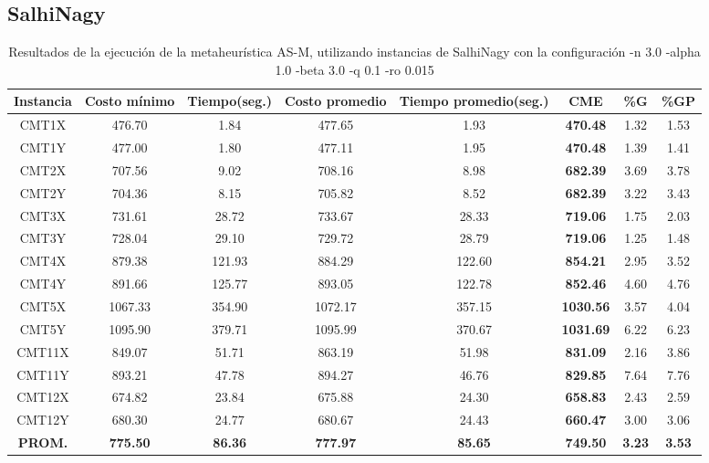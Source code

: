 \subsection{SalhiNagy}\label{tablas-entonacion-AS-M-salhinagy}
\begin{table}[h]
\caption{Resultados de la ejecución de la metaheurística AS-M, utilizando instancias de SalhiNagy con la configuración -n 3.0 -alpha 1.0 -beta 3.0 -q 0.1 -ro 0.015}
\centering
\small
\begin{tabular}{c c c c c c c c}
\hline\hline
Instancia & Costo mínimo & Tiempo(seg.) & Costo promedio & Tiempo promedio(seg.) & CME & \%G & \%GP \\ [0.5ex]
\hline
CMT1X & 476.70 & 1.84 & 
477.65 & 1.93 & \bf{470.48} & 
1.32 & 1.53\\CMT1Y & 477.00 & 1.80 & 
477.11 & 1.95 & \bf{470.48} & 
1.39 & 1.41\\CMT2X & 707.56 & 9.02 & 
708.16 & 8.98 & \bf{682.39} & 
3.69 & 3.78\\CMT2Y & 704.36 & 8.15 & 
705.82 & 8.52 & \bf{682.39} & 
3.22 & 3.43\\CMT3X & 731.61 & 28.72 & 
733.67 & 28.33 & \bf{719.06} & 
1.75 & 2.03\\CMT3Y & 728.04 & 29.10 & 
729.72 & 28.79 & \bf{719.06} & 
1.25 & 1.48\\CMT4X & 879.38 & 121.93 & 
884.29 & 122.60 & \bf{854.21} & 
2.95 & 3.52\\CMT4Y & 891.66 & 125.77 & 
893.05 & 122.78 & \bf{852.46} & 
4.60 & 4.76\\CMT5X & 1067.33 & 354.90 & 
1072.17 & 357.15 & \bf{1030.56} & 
3.57 & 4.04\\CMT5Y & 1095.90 & 379.71 & 
1095.99 & 370.67 & \bf{1031.69} & 
6.22 & 6.23\\CMT11X & 849.07 & 51.71 & 
863.19 & 51.98 & \bf{831.09} & 
2.16 & 3.86\\CMT11Y & 893.21 & 47.78 & 
894.27 & 46.76 & \bf{829.85} & 
7.64 & 7.76\\CMT12X & 674.82 & 23.84 & 
675.88 & 24.30 & \bf{658.83} & 
2.43 & 2.59\\CMT12Y & 680.30 & 24.77 & 
680.67 & 24.43 & \bf{660.47} & 
3.00 & 3.06\\\bf{PROM.} & 
\bf{775.50} & \bf{86.36} & \bf{777.97} & \bf{85.65} & \bf{749.50} & \bf{3.23} & \bf{3.53}\\[1ex]\hline
\end{tabular}
\label{table:nonlin}
\end{table}
